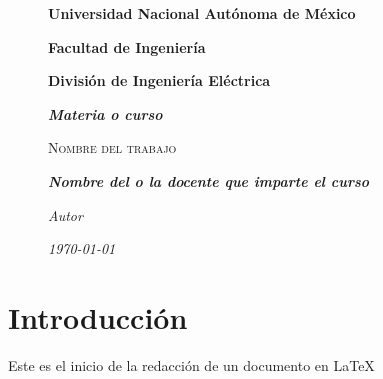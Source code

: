 \documentclass[letterpaper]{article} %
\begin{document}
    \begin{figure}[H]
        \begin{titlepage}%
            
            \centering
            \hspace{7cm}

            \vspace{1cm}
                                    
            \centering
            {\bfseries\LARGE Universidad Nacional Aut\'onoma de M\'exico \par}
            \vspace{1cm}
            {\bfseries\LARGE Facultad de Ingenier\'ia \par}
            \vspace{1cm}
            {\bfseries\LARGE Divisi\'on de Ingenier\'ia El\'ectrica\par}
            \vspace{1cm}
            {\itshape\Large \textbf{Materia o curso\\} \par} 
            \vspace{1cm}
            {\scshape\Huge{Nombre del trabajo\\} \par}
            \vspace{1cm}
            {\itshape\Large \textbf{Nombre del o la docente que imparte el curso\\} \par}
            \vspace{1cm}
            \vfill
            {\itshape\Large Autor \\\par}
            \vfill
            \vspace{1cm}
            {\itshape\Large \today\par}
            
        \end{titlepage}
	\end{figure}
    \newpage

    \section*{Introducci\'on}
        \Large{Este es el inicio de la redacci\'on de un documento en \LaTeX}
\end{document}
